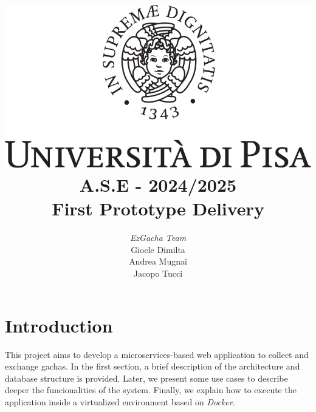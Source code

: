 \documentclass{article}
\begin{document}
\title{\includegraphics[scale=.2]{logo.png} \\[3ex] A.S.E - 2024/2025 \\ First Prototype Delivery}
\author{{\large \emph{EzGacha Team}} \\[1ex] Gioele Dimilta \\ Andrea Mugnai \\ Jacopo Tucci}
\date{}

\maketitle

\newpage
{}
\tableofcontents

\newpage
\section{Introduction}
This project aims to develop a microservices-based web application to collect and exchange gachas. In the first section, a brief description of the architecture and database structure is provided. Later, we present some use cases to describe deeper the funcionalities of the system. Finally, we explain how to execute the application inside a virtualized environment based on \emph{Docker}.
\end{document}

